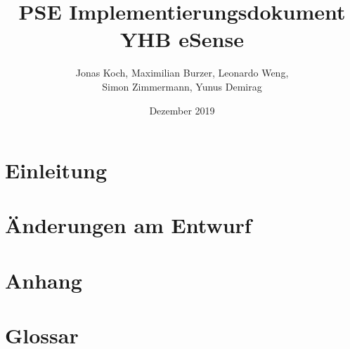 \documentclass[12pt,a4paper,titlepage,ngerman]{article}
\title{PSE Implementierungsdokument YHB eSense}
\author{Jonas Koch, Maximilian Burzer, Leonardo Weng, \\ Simon Zimmermann, Yunus Demirag}
\date{Dezember 2019}
\begin{document}
	
	\part{Einleitung}
	
	\part{Änderungen am Entwurf}
	
	\newpage
	
	\newpage
	
	\newpage
	
	\newpage
	
	\newpage
	
	\newpage
	
	\newpage
	
	\newpage
	
	\part{Anhang}
	
	\part{Glossar}
	
\end{document}

